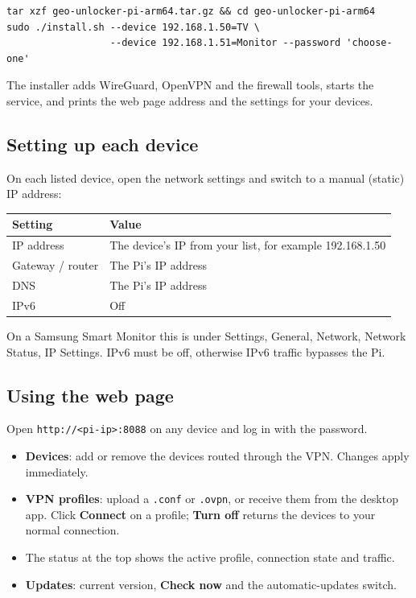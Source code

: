 \documentclass[11pt,a4paper]{article}
\newcommand{\ui}[1]{\textbf{#1}}            %
\newcommand{\file}[1]{\texttt{#1}}          %
\begin{document}
\begin{Verbatim}[frame=single, fontsize=\small]
tar xzf geo-unlocker-pi-arm64.tar.gz && cd geo-unlocker-pi-arm64
sudo ./install.sh --device 192.168.1.50=TV \
                  --device 192.168.1.51=Monitor --password 'choose-one'
\end{Verbatim}

The installer adds WireGuard, OpenVPN and the firewall tools, starts the service, and prints the web page address and the settings for your devices.

\subsection{Setting up each device}

On each listed device, open the network settings and switch to a manual (static) IP address:

\begin{center}
\begin{tabularx}{\linewidth}{@{}l L@{}}
\toprule
\textbf{Setting} & \textbf{Value} \\
\midrule
IP address & The device's IP from your list, for example 192.168.1.50 \\
Gateway / router & The Pi's IP address \\
DNS & The Pi's IP address \\
IPv6 & Off \\
\bottomrule
\end{tabularx}
\end{center}

On a Samsung Smart Monitor this is under Settings, General, Network, Network Status, IP Settings. IPv6 must be off, otherwise IPv6 traffic bypasses the Pi.

\subsection{Using the web page}

Open \file{http://<pi-ip>:8088} on any device and log in with the password.

\begin{itemize}
  \item \ui{Devices}: add or remove the devices routed through the VPN. Changes apply immediately.
  \item \ui{VPN profiles}: upload a \file{.conf} or \file{.ovpn}, or receive them from the desktop app. Click \ui{Connect} on a profile; \ui{Turn off} returns the devices to your normal connection.
  \item The status at the top shows the active profile, connection state and traffic.
  \item \ui{Updates}: current version, \ui{Check now} and the automatic-updates switch.
\end{itemize}
\end{document}
